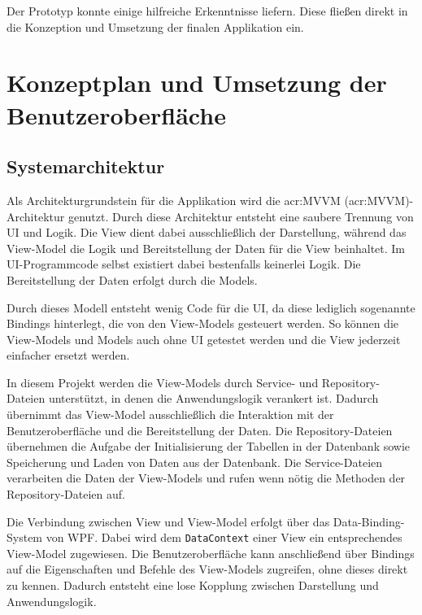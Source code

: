         Der Prototyp konnte einige hilfreiche Erkenntnisse liefern. Diese fließen direkt in die Konzeption und Umsetzung der finalen Applikation ein.

   \section{Konzeptplan und Umsetzung der Benutzeroberfläche}

\subsection{Systemarchitektur}
Als Architekturgrundstein für die Applikation wird die \acrshort{acr:MVVM} (\acrlong{acr:MVVM})-Architektur genutzt. Durch diese Architektur entsteht eine saubere Trennung von UI und Logik. Die View dient dabei ausschließlich der Darstellung, während das View-Model die Logik
 und Bereitstellung der Daten für die View beinhaltet. Im UI-Programmcode selbst existiert dabei bestenfalls keinerlei Logik. Die Bereitstellung der Daten erfolgt durch die Models.

Durch dieses Modell entsteht wenig Code für die UI, da diese lediglich sogenannte Bindings hinterlegt, die von den View-Models gesteuert werden. So können die View-Models und Models auch ohne UI getestet werden und die View jederzeit einfacher ersetzt werden. \autocite{michaelstonisModelViewViewModelNET}

In diesem Projekt werden die View-Models durch Service- und Repository-Dateien unterstützt, in denen die Anwendungslogik verankert ist. Dadurch übernimmt das View-Model ausschließlich die Interaktion mit der Benutzeroberfläche und die Bereitstellung der Daten. Die Repository-Dateien übernehmen die Aufgabe der Initialisierung der Tabellen in der Datenbank
 sowie Speicherung und Laden von Daten aus der Datenbank. Die Service-Dateien verarbeiten die Daten der View-Models und rufen wenn nötig die Methoden der Repository-Dateien auf.

Die Verbindung zwischen View und View-Model erfolgt über das Data-Binding-System von WPF. Dabei wird dem \lstinline|DataContext| einer View ein entsprechendes View-Model zugewiesen. Die Benutzeroberfläche kann anschließend über Bindings auf die Eigenschaften und Befehle des View-Models zugreifen, ohne dieses direkt zu kennen. Dadurch entsteht eine lose Kopplung zwischen Darstellung und Anwendungslogik. \autocite{michaelstonisModelViewViewModelNET}

